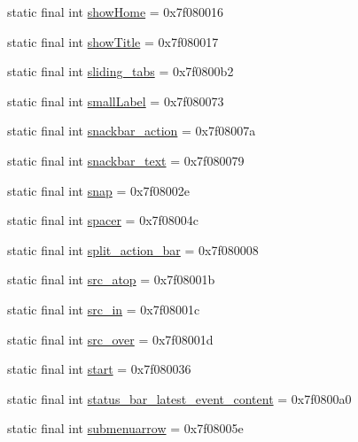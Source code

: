\begin{CompactItemize}
static final int \hyperlink{classandroid_1_1support_1_1v4_1_1_r_1_1id_e25003cc96218188f2a201f287f697e5}{showHome} = 0x7f080016
\item 
static final int \hyperlink{classandroid_1_1support_1_1v4_1_1_r_1_1id_50e7a4a3efcb62e7242a92c1cc5e3159}{showTitle} = 0x7f080017
\item 
static final int \hyperlink{classandroid_1_1support_1_1v4_1_1_r_1_1id_c8a10752c9d58d4605398bd4d21e8891}{sliding\_\-tabs} = 0x7f0800b2
\item 
static final int \hyperlink{classandroid_1_1support_1_1v4_1_1_r_1_1id_9885e4f8e4fdd0d4e596243655f19c1f}{smallLabel} = 0x7f080073
\item 
static final int \hyperlink{classandroid_1_1support_1_1v4_1_1_r_1_1id_e5c2568956573c22af1b01cf38f7ee93}{snackbar\_\-action} = 0x7f08007a
\item 
static final int \hyperlink{classandroid_1_1support_1_1v4_1_1_r_1_1id_7e23c6368baf2699ebc4264ebb3c4c7a}{snackbar\_\-text} = 0x7f080079
\item 
static final int \hyperlink{classandroid_1_1support_1_1v4_1_1_r_1_1id_b18cec24b0ebd0be44cda0030df9a843}{snap} = 0x7f08002e
\item 
static final int \hyperlink{classandroid_1_1support_1_1v4_1_1_r_1_1id_bd42ce66a7fe9ae637e83580b1c4aa9c}{spacer} = 0x7f08004c
\item 
static final int \hyperlink{classandroid_1_1support_1_1v4_1_1_r_1_1id_764aca6e4a1a05e6911b25fb699f6018}{split\_\-action\_\-bar} = 0x7f080008
\item 
static final int \hyperlink{classandroid_1_1support_1_1v4_1_1_r_1_1id_54f45690c0e66855e9ba475090054319}{src\_\-atop} = 0x7f08001b
\item 
static final int \hyperlink{classandroid_1_1support_1_1v4_1_1_r_1_1id_3b1fe7310813aed44e06c81032196136}{src\_\-in} = 0x7f08001c
\item 
static final int \hyperlink{classandroid_1_1support_1_1v4_1_1_r_1_1id_97fd0140638b60720fb1d3e643df0a37}{src\_\-over} = 0x7f08001d
\item 
static final int \hyperlink{classandroid_1_1support_1_1v4_1_1_r_1_1id_1899870ae1d9308f0fe179896370747b}{start} = 0x7f080036
\item 
static final int \hyperlink{classandroid_1_1support_1_1v4_1_1_r_1_1id_d5148188afcd19c1129a587170a7664b}{status\_\-bar\_\-latest\_\-event\_\-content} = 0x7f0800a0
\item 
static final int \hyperlink{classandroid_1_1support_1_1v4_1_1_r_1_1id_e0e8bde8a5920021192a566797132f96}{submenuarrow} = 0x7f08005e

\end{CompactItemize}
